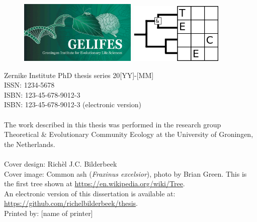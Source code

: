 \begin{titlepage}
	\vfill
	\begin{figure}[!h]
		\includegraphics[width=0.5\textwidth]{images/frontmatter/gelifes_header_600x320.png}
		\includegraphics[width=0.4\textwidth]{images/frontmatter/tece_logo_2.png}
	\end{figure}
	\noindent
	{\small 
		Zernike Institute PhD thesis series 20[YY]-[MM] \\
		ISSN: 1234-5678\\
		ISBN:	123-45-678-9012-3 \\
		ISBN: 123-45-678-9012-3 (electronic version) \\
		\\
		The work described in this thesis was performed in the research group 
    Theoretical \& Evolutionary Community Ecology at the University of Groningen, the Netherlands. \\
		\\
		Cover design: Rich\`el J.C. Bilderbeek\\
		Cover image: Common ash (\textit{Fraxinus excelsior}), photo by Brian Green. 
    This is the first tree shown at \url{https://en.wikipedia.org/wiki/Tree}.
		\\
		An electronic version of this dissertation is available at: \\
	  \url{https://github.com/richelbilderbeek/thesis}. \\
		Printed by: [name of printer] \\
		} 	
	
	
	\clearpage
	
	
	
\end{titlepage}
